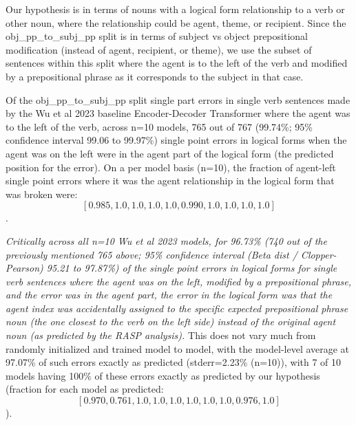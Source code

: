 \documentclass[11pt]{article}
\begin{document}

Our hypothesis is in terms of nouns with a logical form relationship to a verb or other noun, where the relationship could be agent, theme, or recipient.
Since the obj\_pp\_to\_subj\_pp split is in terms of subject vs object prepositional modification (instead of agent, recipient, or theme), we use the subset of sentences within this split where the agent is to the left of the verb and modified by a prepositional phrase as it corresponds to the subject in that case.

Of the obj\_pp\_to\_subj\_pp split single part errors in single verb sentences made by the Wu et al 2023 baseline Encoder-Decoder Transformer where the agent was to the left of the verb, 
across n=10 models, 765 out of 767 (99.74\%; 95\% confidence interval 99.06 to 99.97\%) single point errors in logical forms when the agent was on the left were in the agent part of the logical form (the predicted position for the error). On a per model basis (n=10), the fraction of agent-left single point errors where it was the agent relationship in the logical form that was broken were: $$[0.985, 1.0, 1.0, 1.0, 1.0, 0.990, 1.0, 1.0, 1.0, 1.0]$$.

\textit{Critically across all n=10 Wu et al 2023 models, for 96.73\% (740 out of the previously mentioned 765 above; 95\% confidence interval (Beta dist / Clopper-Pearson) 95.21 to 97.87\%) of the single point errors in logical forms for single verb sentences where the agent was on the left, modified by a prepositional phrase, and the error was in the agent part, the error in the logical form was that the agent index was accidentally assigned to the specific expected prepositional phrase noun (the one closest to the verb on the left side) instead of the original agent noun (as predicted by the RASP analysis).}
This does not vary much from randomly initialized and trained model to model, with the model-level average at 97.07\% of such errors exactly as predicted (stderr=2.23\% (n=10)), with 7 of 10 models having 100\% of these errors exactly as predicted by our hypothesis (fraction for each model as predicted: $$[0.970, 0.761, 1.0, 
1.0, 1.0, 1.0, 
1.0, 1.0, 0.976, 1.0]$$).
\end{document}

